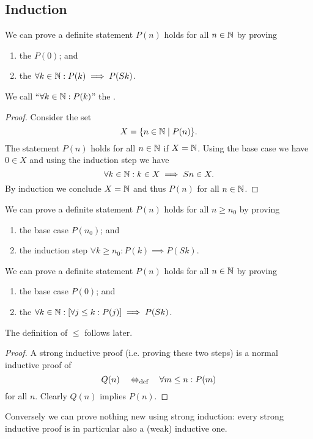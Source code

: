 \subsection{Induction}
\begin{lemma}
We can prove a definite statement $P(n)$ holds for all $n\in \mathbb{N}$ by proving
\begin{enumerate}
\item the  $P(0)$; and
\item the  $\forall k\in \mathbb{N}: P(k)\implies P(Sk)$.
\end{enumerate}
We call ``$\forall k\in \mathbb{N}: P(k)$'' the .
\end{lemma}
\begin{proof}
Consider the set
\[ X = \{ n\in \mathbb{N}\;|\; P(n) \}. \]
The statement $P(n)$ holds for all $n\in \mathbb{N}$ if $X=\mathbb{N}$. Using the base case we have $0\in X$ and using the induction step we have
\[ \forall k\in\mathbb{N}: k\in X \implies Sn\in X. \]
By induction we conclude $X=\mathbb{N}$ and thus $P(n)$ for all $n\in \mathbb{N}$.
\end{proof}
\begin{corollary}
We can prove a definite statement $P(n)$ holds for all $n\geq n_0$ by proving
\begin{enumerate}
\item the base case $P(n_0)$; and
\item the induction step $\forall k\geq n_0: P(k)\implies P(Sk)$.
\end{enumerate}
\end{corollary}

\begin{lemma}
We can prove a definite statement $P(n)$ holds for all $n\in \mathbb{N}$ by proving
\begin{enumerate}
\item the base case $P(0)$; and
\item the  $\forall k\in \mathbb{N}: [\forall j\leq k:  P(j)] \implies P(Sk)$.
\end{enumerate}
\end{lemma}
The definition of $\leq$ follows later.
\begin{proof}
A strong inductive proof (i.e. proving these two steps) is a normal inductive proof of
\[ Q(n) \quad\Leftrightarrow_{\text{def}}\quad \forall m\leq n: P(m) \]
for all $n$. Clearly $Q(n)$ implies $P(n)$.
\end{proof}
Conversely we can prove nothing new using strong induction: every strong inductive proof is in particular also a (weak) inductive one.

